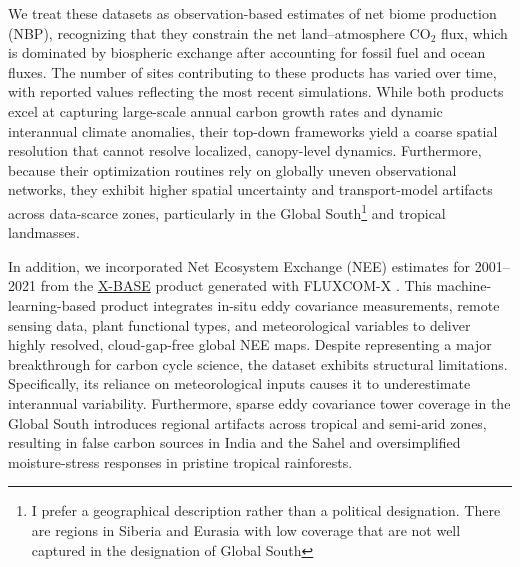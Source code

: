 \documentclass[ProofPDF]{./Styles/Jnls-Template-V3}
\begin{document}
We treat these datasets as observation-based estimates of net biome production (NBP), recognizing that they constrain the net land–atmosphere CO$_2$ flux, which is dominated by biospheric exchange after accounting for fossil fuel and ocean fluxes. The number of sites contributing to these products has varied over time, with reported values reflecting the most recent simulations. While both products excel at capturing large-scale annual carbon growth rates and dynamic interannual climate anomalies, their top-down frameworks yield a coarse spatial resolution that cannot resolve localized, canopy-level dynamics. Furthermore, because their optimization routines rely on globally uneven observational networks, they exhibit higher spatial uncertainty and transport-model artifacts across data-scarce zones, particularly in the Global South\footnote{\color{blue} I prefer a geographical description rather than a political designation. There are regions in Siberia and Eurasia with low coverage that are not well captured in the designation of Global South} and tropical landmasses. 

In addition, we incorporated Net Ecosystem Exchange (NEE) estimates for 2001--2021 from the \hyperlink{https://meta.icos-cp.eu/collections/zfwf1Ak2I7OlziGDTX8Xl6_T}{X-BASE} product generated with FLUXCOM-X \citep{Nelson2024}. This machine-learning-based product integrates in-situ eddy covariance measurements, remote sensing data, plant functional types, and meteorological variables to deliver highly resolved, cloud-gap-free global NEE maps. Despite representing a major breakthrough for carbon cycle science, the dataset exhibits structural limitations. Specifically, its reliance on meteorological inputs causes it to underestimate interannual variability. Furthermore, sparse eddy covariance tower coverage in the Global South introduces regional artifacts across tropical and semi-arid zones, resulting in  false carbon sources in India and the Sahel and oversimplified moisture-stress responses in pristine tropical rainforests.


\end{document}

